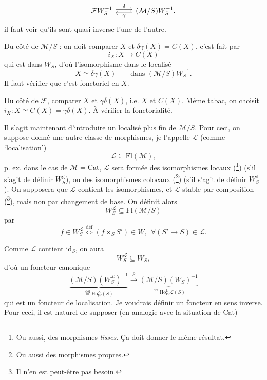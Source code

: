 \documentclass[11pt]{article}
\newcommand{\printedpage}[1]{\marginpar{\footnotesize p.~#1}}
\newcommand{\msp}[1]{\marginpar{\footnotesize [#1]}}
\newcommand{\Ho}{\mathrm{Ho}}
\newcommand{\WL}{W_S^{\mathcal{L}}}
\newcommand{\defeq}{\overset{\text{déf}}{=}}
\begin{document}
\printedpage{59}
\[
\begin{tikzcd}
\mathcal{F}W_S^{-1} \arrow[r, shift left, "\delta"] & (\mathcal{M}/S)W_S^{-1}, \arrow[l, shift left, "\gamma"]
\end{tikzcd}
\]
il faut voir qu'ils sont quasi-inverse l'une de \msp{page 94} l'autre.

Du côté de $\mathcal{M}/S$ : on doit comparer $X$ et $\delta\gamma(X) = C(X)$, c'est fait par
\[
i_X : X \longrightarrow C(X)
\]
qui est dans $W_S$, d'où l'isomorphisme dans le localisé
\[
X \simeq \delta\gamma(X) \qquad \text{dans } (\mathcal{M}/S)W_S^{-1}.
\]
Il faut vérifier que c'est fonctoriel en $X$.

Du côté de $\mathcal{F}$, comparer $X$ et $\gamma\delta(X)$, i.e. $X$ et $C(X)$. Même tabac, on choisit $i_X : X \simeq C(X) = \gamma\delta(X)$. À vérifier la fonctorialité.

Il s'agit maintenant d'introduire un localisé plus fin de $\mathcal{M}/S$. Pour ceci, on suppose donné une autre classe de morphismes, je l'appelle $\mathcal{L}$ (comme `localisation')
\[
\mathcal{L} \subseteq \mathrm{Fl}(\mathcal{M}),
\]
p. ex. dans le cas de $\mathcal{M} = \mathrm{Cat}$, $\mathcal{L}$ sera formée des isomorphismes locaux (\footnote[55]{Ou aussi, des morphismes \textit{lisses}. Ça doit donner le même résultat.}) (s'il s'agit de définir $W_S^{\mathrm{g}}$), ou des isomorphismes colocaux (\footnote[56]{Ou aussi des morphismes propres.}) (s'il s'agit de définir $W_S^{\mathrm{d}}$). On supposera que $\mathcal{L}$ contient les isomorphismes, et $\mathcal{L}$ stable par composition (\footnote[57]{Il n'en est peut-être pas besoin.}), mais non par changement de base. On définit alors
\[
\WL \subseteq \mathrm{Fl}(\mathcal{M}/S)
\]
par
\[
f \in \WL \overset{\text{déf}}{\Longleftrightarrow} (f \times_S S') \in W,\ \ \forall (S' \longrightarrow S) \in \mathcal{L}.
\]
\msp{page 95}

Comme $\mathcal{L}$ contient $\mathrm{id}_S$, on aura
\[
\WL \subseteq W_S,
\]
d'où un foncteur canonique
\[
\underbrace{(\mathcal{M}/S)(\WL)^{-1}}_{\defeq \Ho_W^{\mathcal{L}}(S)} \xrightarrow{\ \rho\ } \underbrace{(\mathcal{M}/S)(W_S)^{-1}}_{\defeq \Ho_W^{\mathrm{lc}}\mathcal{L}(S)} %
\]
\printedpage{60}
qui est un foncteur de localisation. Je voudrais définir un foncteur en sens inverse. Pour ceci, il est naturel de supposer (en analogie avec la situation de Cat)
\end{document}
